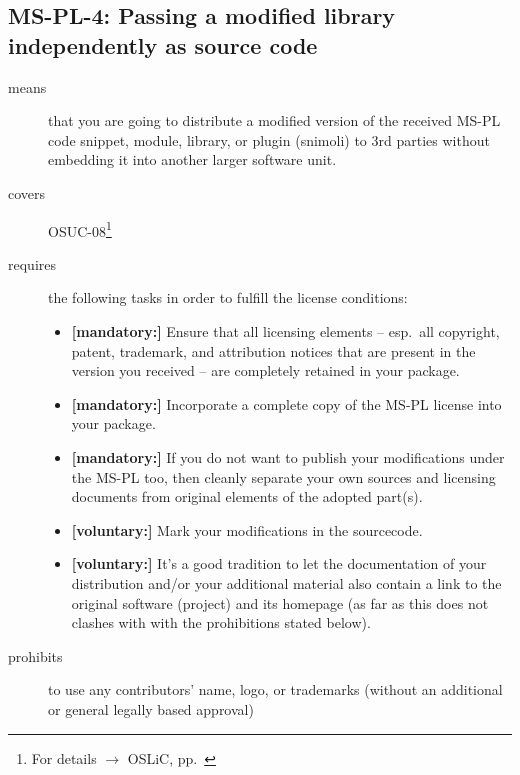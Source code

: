 \subsection{MS-PL-4: Passing a modified library independently as source code}
\label{OSUC-08-MS-PL}
\begin{description}
\item[means] that you are going to distribute a modified version of the received
MS-PL code snippet, module, library, or plugin (snimoli) to 3rd parties without
embedding it into another larger software unit.
\item[covers] OSUC-08\footnote{For details $\rightarrow$ OSLiC, pp.\ \pageref{OSUC-08-DEF}}
\item[requires] the following tasks in order to fulfill the license conditions:

\begin{itemize}
  \item \textbf{[mandatory:]} Ensure that all licensing elements -- esp.\ all
  copyright, patent, trademark, and attribution notices that are present in the
  version you received -- are completely retained in your package.
 
  \item \textbf{[mandatory:]} Incorporate a complete copy of the MS-PL license
  into your package.
  
  \item \textbf{[mandatory:]} If you do not want to publish your modifications
  under the MS-PL too, then cleanly separate your own sources and licensing
  documents from original elements of the adopted part(s).
  
  \item \textbf{[voluntary:]} Mark your modifications in the sourcecode.
  
  \item \textbf{[voluntary:]} It's a good tradition to let the documentation of
  your distribution and/or your additional material also contain a link to the
  original software (project) and its homepage (as far as this does not clashes
  with with the prohibitions stated below).
  
\end{itemize}

\item[prohibits] to use any contributors' name, logo, or trademarks (without an
additional or general legally based approval)

\end{description}

